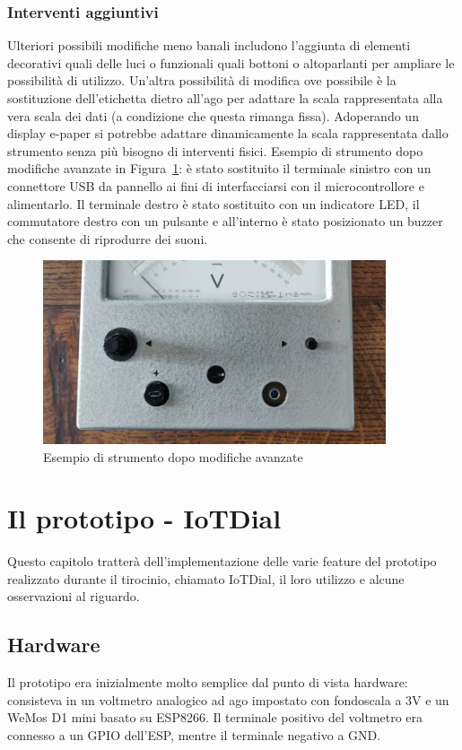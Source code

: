 \documentclass[12pt,a4paper]{report}
\begin{document}
\subsection{Interventi aggiuntivi}
Ulteriori possibili modifiche meno banali includono l'aggiunta di elementi decorativi quali delle luci o funzionali quali bottoni o altoparlanti
per ampliare le possibilità di utilizzo. Un'altra possibilità di modifica ove possibile è la sostituzione dell'etichetta dietro all'ago per adattare
la scala rappresentata alla vera scala dei dati (a condizione che questa rimanga fissa). Adoperando un display e-paper si potrebbe
adattare dinamicamente la scala rappresentata dallo strumento senza più bisogno di interventi fisici. Esempio di strumento dopo
modifiche avanzate in Figura~\ref{fig:interventocompleto}: è stato sostituito il terminale sinistro con un connettore USB da pannello
ai fini di interfacciarsi con il microcontrollore e alimentarlo. Il terminale destro è stato sostituito con un indicatore LED, il commutatore
destro con un pulsante e all'interno è stato posizionato un buzzer che consente di riprodurre dei suoni.

\begin{figure}[h]
  \centering
  \includegraphics[width=0.9\textwidth]{interventocompleto}
  \caption{Esempio di strumento dopo modifiche avanzate}
  \label{fig:interventocompleto}
\end{figure}

\chapter{Il prototipo - IoTDial}
Questo capitolo tratterà dell'implementazione delle varie feature del prototipo realizzato durante il tirocinio, chiamato IoTDial,
il loro utilizzo e alcune osservazioni al riguardo.

\section{Hardware}
Il prototipo era inizialmente molto semplice dal punto di vista hardware: consisteva in un voltmetro analogico ad ago impostato con
fondoscala a 3V e un WeMos D1 mini basato su ESP8266. Il terminale positivo del voltmetro era connesso a un GPIO dell'ESP,
mentre il terminale negativo a GND.
\end{document}
